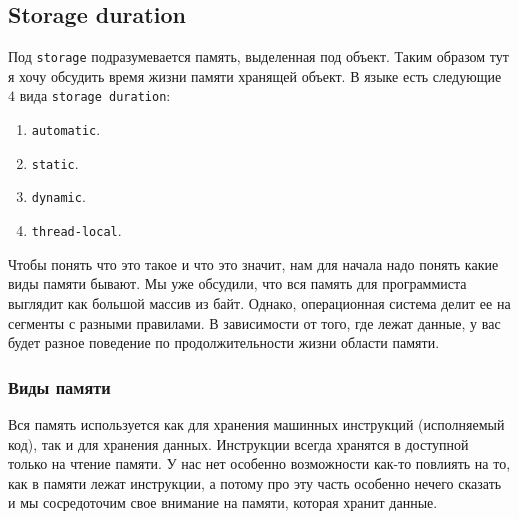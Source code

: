 \documentclass{article}
\begin{document}
\subsection{Storage duration}
\label{section::StorageDuration}

Под \verb"storage" подразумевается память, выделенная под объект.
Таким образом тут я хочу обсудить время жизни памяти хранящей объект.
В языке есть следующие $4$ вида \verb"storage duration":
\begin{enumerate}
\item \verb"automatic".

\item \verb"static".

\item \verb"dynamic".

\item \verb"thread-local".
\end{enumerate}
Чтобы понять что это такое и что это значит, нам для начала надо понять какие виды памяти бывают.
Мы уже обсудили, что вся память для программиста выглядит как большой массив из байт.
Однако, операционная система делит ее на сегменты с разными правилами.
В зависимости от того, где лежат данные, у вас будет разное поведение по продолжительности жизни области памяти.

\subsubsection{Виды памяти}

Вся память используется как для хранения машинных инструкций (исполняемый код), так и для хранения данных.
Инструкции всегда хранятся в доступной только на чтение памяти.
У нас нет особенно возможности как-то повлиять на то, как в памяти лежат инструкции, а потому про эту часть особенно нечего сказать и мы сосредоточим свое внимание на памяти, которая хранит данные.
\end{document}
